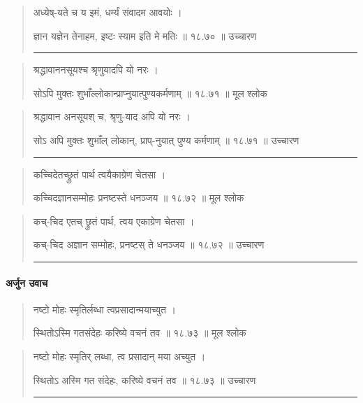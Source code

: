 \begin{quotation}

अध्येष्-यते च य इमं, धर्म्यं संवादम आवयोः  ।  

ज्ञान यज्ञेन तेनाहम, इष्टः स्याम इति मे मतिः  ॥ १८.७० ॥  उच्चारण

\noindent\rule{16cm}{0.4pt} 
\end{quotation}


\begin{quotation}

श्रद्धावाननसूयश्च श्रृणुयादपि यो नरः  ।  

सोऽपि मुक्तः शुभाँल्लोकान्प्राप्नुयात्पुण्यकर्मणाम्‌  ॥ १८.७१ ॥  मूल श्लोक
\end{quotation}

\begin{quotation}
श्रद्धावान अनसूयश् च, 
श्रृणु-याद अपि यो नरः  ।  

सोऽ अपि मुक्तः शुभाँल् लोकान्, 
प्राप्-नुयात् पुण्य कर्मणाम्‌  ॥ १८.७१ ॥  उच्चारण

\noindent\rule{16cm}{0.4pt} 
\end{quotation}


\begin{quotation}

कच्चिदेतच्छ्रुतं पार्थ त्वयैकाग्रेण चेतसा  ।  

कच्चिदज्ञानसम्मोहः प्रनष्टस्ते धनञ्जय  ॥ १८.७२ ॥  मूल श्लोक
\end{quotation}

\begin{quotation}

कच्-चिद एतच् छ्रुतं पार्थ, त्वय एकाग्रेण चेतसा  ।  

कच्-चिद अज्ञान सम्मोहः, प्रनष्टस् ते धनञ्जय  ॥ १८.७२ ॥  उच्चारण

\noindent\rule{16cm}{0.4pt} 
\end{quotation}

\paragraph{\sanskrit अर्जुन उवाच}

\begin{quotation}

नष्टो मोहः स्मृतिर्लब्धा त्वप्रसादान्मयाच्युत  ।  

स्थितोऽस्मि गतसंदेहः करिष्ये वचनं तव  ॥ १८.७३ ॥  मूल श्लोक
\end{quotation}

\begin{quotation}

नष्टो मोहः स्मृतिर् लब्धा, त्व प्रसादान् मया अच्युत  ।  

स्थितोऽ अस्मि गत संदेहः, करिष्ये वचनं तव  ॥ १८.७३ ॥  उच्चारण

\noindent\rule{16cm}{0.4pt} 
\end{quotation}




